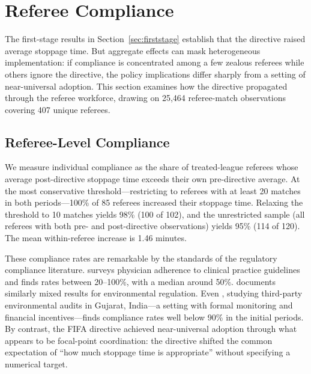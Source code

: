 
\section{Referee Compliance}\label{sec:compliance}

The first-stage results in Section~\ref{sec:firststage} establish that
the directive raised average stoppage time. But aggregate effects can
mask heterogeneous implementation: if compliance is concentrated among
a few zealous referees while others ignore the directive, the policy
implications differ sharply from a setting of near-universal adoption.
This section examines how the directive propagated through the referee
workforce, drawing on 25,464 referee-match observations covering 407
unique referees.

\subsection{Referee-Level Compliance}

We measure individual compliance as the share of treated-league
referees whose average post-directive stoppage time exceeds their own
pre-directive average. At the most conservative threshold---restricting
to referees with at least 20 matches in both periods---100\% of
85 referees increased their stoppage time. Relaxing the threshold to 10
matches yields 98\% (100 of 102), and the unrestricted sample (all referees with
both pre- and post-directive observations) yields 95\% (114 of 120). The mean
within-referee increase is 1.46 minutes.

These compliance rates are remarkable by the standards of the
regulatory compliance literature. \citet{cabana1999compliance} surveys
physician adherence to clinical practice guidelines and finds rates
between 20--100\%, with a median around 50\%.
\citet{cohen1990compliance} documents similarly mixed results for
environmental regulation. Even \citet{duflo2013enforcement}, studying
third-party environmental audits in Gujarat, India---a setting with
formal monitoring and financial incentives---finds compliance rates
well below 90\% in the initial periods. By contrast, the FIFA
directive achieved near-universal adoption through what appears to be
focal-point coordination: the directive shifted the common expectation
of ``how much stoppage time is appropriate'' without specifying a
numerical target.

